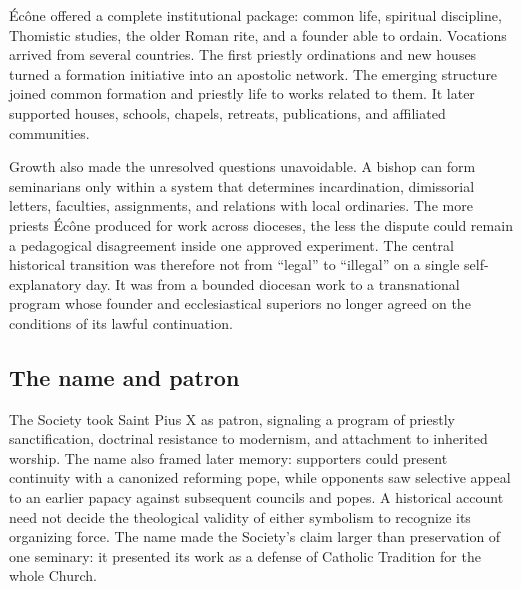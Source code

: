 Écône offered a complete institutional package: common life, spiritual discipline, Thomistic studies, the older Roman rite, and a founder able to ordain. Vocations arrived from several countries. The first priestly ordinations and new houses turned a formation initiative into an apostolic network. The emerging structure joined common formation and priestly life to works related to them. It later supported houses, schools, chapels, retreats, publications, and affiliated communities.

Growth also made the unresolved questions unavoidable. A bishop can form seminarians only within a system that determines incardination, dimissorial letters, faculties, assignments, and relations with local ordinaries. The more priests Écône produced for work across dioceses, the less the dispute could remain a pedagogical disagreement inside one approved experiment. The central historical transition was therefore not from ``legal'' to ``illegal'' on a single self-explanatory day. It was from a bounded diocesan work to a transnational program whose founder and ecclesiastical superiors no longer agreed on the conditions of its lawful continuation.

\subsection{The name and patron}

The Society took Saint Pius X as patron, signaling a program of priestly sanctification, doctrinal resistance to modernism, and attachment to inherited worship. The name also framed later memory: supporters could present continuity with a canonized reforming pope, while opponents saw selective appeal to an earlier papacy against subsequent councils and popes. A historical account need not decide the theological validity of either symbolism to recognize its organizing force. The name made the Society's claim larger than preservation of one seminary: it presented its work as a defense of Catholic Tradition for the whole Church.
